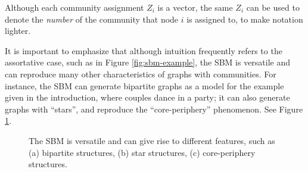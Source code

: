 \documentclass[../../main.tex]{subfiles} %
\begin{document}
\begin{remark}
	Although each community assignment \(Z_i\) is a vector, the same \(Z_i\) 
	can be used to denote the \textit{number} of the community that node \(i\) 
	is assigned to, to make notation lighter.
\end{remark}

It is important to emphasize that although intuition frequently refers to the 
assortative case, such as in Figure \ref{fig:sbm-example}, the SBM is versatile 
and can reproduce many other characteristics of graphs with communities. For 
instance, the SBM can generate bipartite graphs as a model for the example 
given in the introduction, where couples dance in a party; it can also generate 
graphs with ``stars'', and reproduce the ``core-periphery'' phenomenon. See 
Figure \ref{fig:sbm-versatile}.


\begin{figure}
	\centering
	\setlength\tabcolsep{4ex}
	\caption{The SBM is versatile and can give rise to different features, such 
	as (a) bipartite structures, (b) star structures, (c) core-periphery 
	structures.}
	\label{fig:sbm-versatile}
\end{figure}
\end{document}

